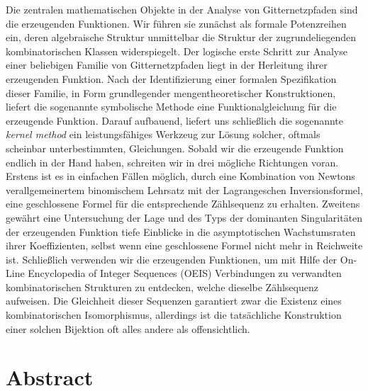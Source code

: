 Die zentralen mathematischen Objekte in der Analyse von Gitternetzpfaden sind die erzeugenden Funktionen.
Wir führen sie zunächst als formale Potenzreihen ein, deren algebraische Struktur unmittelbar die Struktur der zugrundeliegenden kombinatorischen Klassen widerspiegelt. 
Der logische erste Schritt zur Analyse einer beliebigen Familie von Gitternetzpfaden liegt in der Herleitung ihrer erzeugenden Funktion. 
Nach der Identifizierung einer formalen Spezifikation dieser Familie, in Form grundlegender mengentheoretischer Konstruktionen, liefert die sogenannte symbolische Methode eine Funktionalgleichung für die erzeugende Funktion. Darauf aufbauend, liefert uns schließlich die sogenannte \textit{kernel method} ein leistungsfähiges Werkzeug zur Lösung solcher, oftmals scheinbar unterbestimmten, Gleichungen.
Sobald wir die erzeugende Funktion endlich in der Hand haben, schreiten wir in drei mögliche Richtungen voran.
Erstens ist es in einfachen Fällen möglich, durch eine Kombination von Newtons verallgemeinertem binomischem Lehrsatz mit der Lagrangeschen Inversionsformel, eine geschlossene Formel für die entsprechende Zählsequenz zu erhalten. 
Zweitens gewährt eine Untersuchung der Lage und des Typs der dominanten Singularitäten der erzeugenden Funktion tiefe Einblicke in die
asymptotischen Wachstumsraten ihrer Koeffizienten, selbst wenn eine geschlossene Formel nicht mehr in Reichweite ist. 
Schließlich verwenden wir die erzeugenden Funktionen, um mit Hilfe der On-Line Encyclopedia of Integer Sequences (OEIS) Verbindungen zu verwandten kombinatorischen Strukturen zu entdecken, welche dieselbe Zählsequenz aufweisen. Die Gleichheit dieser Sequenzen garantiert zwar die Existenz eines kombinatorischen Isomorphismus, allerdings ist die tatsächliche Konstruktion einer solchen Bijektion oft alles andere als
offensichtlich.

\cleardoublepage

\chapter*{Abstract}
\thispagestyle{empty}

